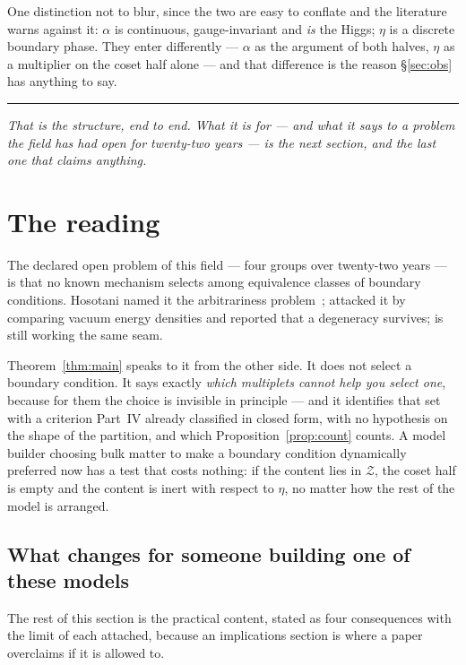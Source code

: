 \documentclass[11pt,a4paper]{article}
\newcommand{\bridge}[1]{\par\medskip\noindent
  \textcolor{hdrblue!45}{\rule{2.2cm}{0.6pt}}\;\;\parbox[t]{0.84\textwidth}{\small\itshape
  \textcolor{hdrblue!85}{#1}}\par\medskip}
\begin{document}
\medskip
One distinction not to blur, since the two are easy to conflate and the literature warns against it:
$\alpha$ is continuous, gauge-invariant and \emph{is} the Higgs; $\eta$ is a discrete boundary phase.
They enter differently --- $\alpha$ as the argument of both halves, $\eta$ as a multiplier on the
coset half alone --- and that difference is the reason \S\ref{sec:obs} has anything to say.

\bridge{That is the structure, end to end. What it is \emph{for} --- and what it says to a problem
the field has had open for twenty-two years --- is the next section, and the last one that claims
anything.}

\section{The reading}\label{sec:reading}

The declared open problem of this field --- four groups over twenty-two years --- is that no known
mechanism selects among equivalence classes of boundary conditions. Hosotani named it the
arbitrariness problem~\cite{HosotaniArb}; \cite{HHK} attacked it by comparing vacuum energy densities and reported that
a degeneracy survives; \cite{KKKY} is still working the same seam.

Theorem~\ref{thm:main} speaks to it from the other side. It does not select a boundary condition. It
says exactly \emph{which multiplets cannot help you select one}, because for them the choice is
invisible in principle --- and it identifies that set with a criterion Part~IV already classified in
closed form, with no hypothesis on the shape of the partition, and which
Proposition~\ref{prop:count} counts. A model builder choosing bulk matter
to make a boundary condition dynamically preferred now has a test that costs nothing: if the content
lies in $\mathcal Z$, the coset half is empty and the content is inert with respect to $\eta$, no
matter how the rest of the model is arranged.

\subsection*{What changes for someone building one of these models}

The rest of this section is the practical content, stated as four consequences with the limit of
each attached, because an implications section is where a paper overclaims if it is allowed to.
\end{document}
